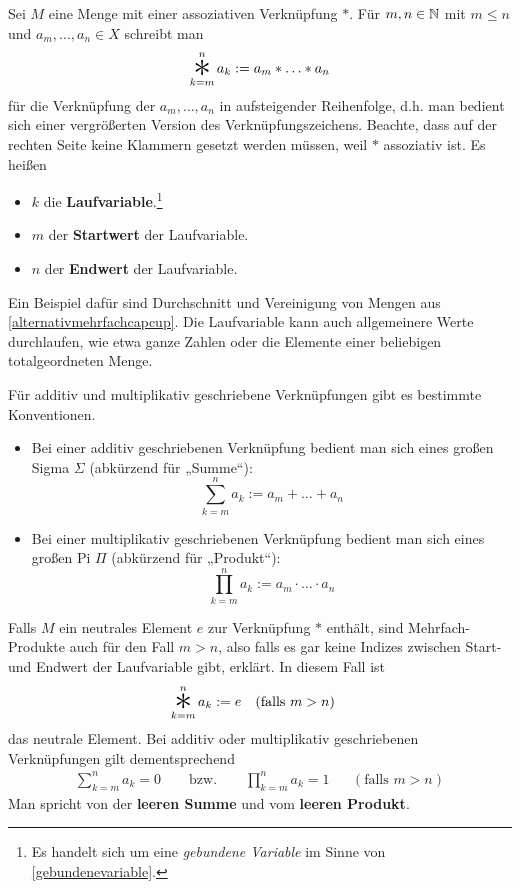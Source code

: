 \begin{nota} \label{mehrfachprodukt}
    Sei $M$ eine Menge mit einer assoziativen Verknüpfung $*$. Für $m,n\in \mathbb N$ mit $m\le n$ und $a_m,\dots , a_n\in X$ schreibt man
        \[ \mathop{\raisebox{-0.6ex}{\scalebox{2.5}{$*$}}}_{k=m}^n a_k := a_m * \ldots * a_n \]
    für die Verknüpfung der $a_m,\dots , a_n$ in aufsteigender Reihenfolge, d.h. man bedient sich einer vergrößerten Version des Verknüpfungszeichens. Beachte, dass auf der rechten Seite keine Klammern gesetzt werden müssen, weil $*$ assoziativ ist. Es heißen
    \begin{itemize}
        \item $k$ die \textbf{Laufvariable}.\footnote{Es handelt sich um eine \emph{gebundene Variable} im Sinne von \cref{gebundenevariable}.}
        \item $m$ der \textbf{Startwert} der Laufvariable.
        \item $n$ der \textbf{Endwert} der Laufvariable.
    \end{itemize}
    Ein Beispiel dafür sind Durchschnitt und Vereinigung von Mengen aus \cref{alternativmehrfachcapcup}. Die Laufvariable kann auch allgemeinere Werte durchlaufen, wie etwa ganze Zahlen oder die Elemente einer beliebigen totalgeordneten Menge.
    
    Für additiv und multiplikativ geschriebene Verknüpfungen gibt es bestimmte Konventionen.
    \begin{itemize}
        \item Bei einer additiv geschriebenen Verknüpfung bedient man sich eines großen Sigma $\Sigma$ (abkürzend für „Summe“):
            \[ \sum_{k=m}^n a_k := a_m + \ldots + a_n \]
        \item Bei einer multiplikativ geschriebenen Verknüpfung bedient man sich eines großen Pi $\Pi$ (abkürzend für „Produkt“):
            \[ \prod_{k=m}^n a_k := a_m \cdot \ldots \cdot a_n \]
    \end{itemize}
    Falls $M$ ein neutrales Element $e$ zur Verknüpfung $*$ enthält, sind Mehrfach-Produkte auch für den Fall $m>n$, also falls es gar keine Indizes zwischen Start- und Endwert der Laufvariable gibt, erklärt. In diesem Fall ist
    \begin{align*}
        \mathop{\raisebox{-0.6ex}{\scalebox{2.5}{$*$}}}_{k=m}^n a_k & := e && (\text{falls $m>n$})
    \end{align*}
    das neutrale Element. Bei additiv oder multiplikativ geschriebenen Verknüpfungen gilt dementsprechend
    \begin{align*}
        \sum_{k=m}^n a_k = 0 \qquad\text{bzw.}\qquad \prod_{k=m}^n a_k = 1 && (\text{falls $m>n$})
    \end{align*}
    Man spricht von der \textbf{leeren Summe} und vom \textbf{leeren Produkt}.
    

\end{nota}

